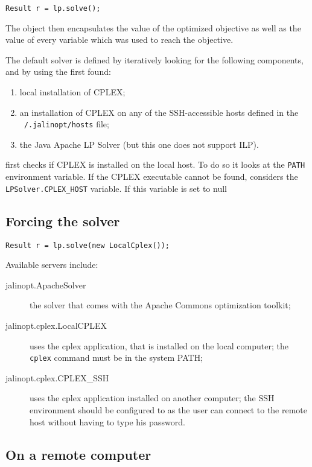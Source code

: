 \documentclass{article}
\begin{document}
\begin{lstlisting}
Result r = lp.solve();
\end{lstlisting}

The  object then encapsulates the value of the optimized objective as well as the value of
every variable which was used to reach the objective. 

The default solver is defined by iteratively looking for the following components, and by using the first found:

\begin{enumerate}
  \item local installation of CPLEX;
  \item an installation of CPLEX on any of the SSH-accessible hosts defined in the \texttt{~/.jalinopt/hosts} file;
  \item the Java Apache LP Solver (but this one does not support ILP).
\end{enumerate}

\jalinopt first checks if CPLEX is installed on the local host. To do so
it looks at the \texttt{PATH} environment variable. If the CPLEX executable cannot be found, \jalinopt considers the 
\texttt{LPSolver.CPLEX\_HOST} variable. If this variable is set to null

\subsection{Forcing the solver}

\begin{lstlisting}
Result r = lp.solve(new LocalCplex());
\end{lstlisting}

Available servers include:
\begin{description}
  \item[jalinopt.ApacheSolver] the solver that comes with the Apache Commons optimization toolkit;
  \item[jalinopt.cplex.LocalCPLEX] uses the cplex application, that is installed on the local computer; the \texttt{cplex} command
  must be in the system PATH;
  \item[jalinopt.cplex.CPLEX\_SSH] uses the cplex application installed on another computer; the SSH environment should be
  configured to as the user can connect to the remote host without having to type his password.
\end{description}


\subsection{On a remote computer}
\end{document}
